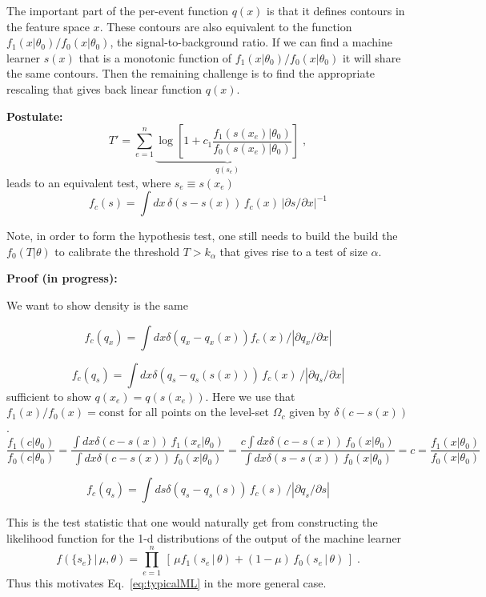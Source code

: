\documentclass[11pt, oneside]{article}   	%
\begin{document}
The important part of the per-event function $q(x)$ is that it defines contours in the feature space $x$. These contours are also equivalent to the function $f_1(x|\theta_0)/f_0(x|\theta_0)$, the signal-to-background ratio. If we can find a machine learner $s(x)$ that is a monotonic function of $f_1(x|\theta_0)/f_0(x|\theta_0)$ it will share the same contours. Then the remaining challenge is to find the appropriate rescaling that gives back  linear function $q(x)$. 

\textbf{Postulate:}
\[
T' = \sum_{e=1}^n \underbrace{\log \left[ 1+c_1\frac {f_1(s(x_e) | \theta_0) }{ f_0(s(x_e) | \theta_0) } \right]}_{q(s_e)} \;,
\]
leads to an equivalent test, where $s_e \equiv s(x_e)$
\[
f_c(s) = \int dx \, \delta(s-s(x)) \, f_c(x)  \,  |\partial s / \partial x|^{-1}
\]



Note, in order to form the hypothesis test, one still needs to build the build the $f_0(T|\theta)$ to calibrate the threshold  $T>k_\alpha$ that gives rise to a test of size $\alpha$. 



\textbf{Proof (in progress):}

We want to show density is the same 

\[
f_c(q_x) = \int dx \delta(q_x-q_x(x)) f_c(x) / |\partial q_x / \partial x|
\]

\[
f_c(q_s) = \int dx \delta(q_s-q_s(s(x))) \, f_c(x) \, / |\partial q_s / \partial x|
\]
sufficient to show $q(x_e) = q(s(x_e))$.  Here we use that $f_1(x)/f_0(x)=\textrm{const}$ for all points on the level-set $\Omega_c$ given by $ \delta(c-s(x))$. 
\[
\frac {f_1(c | \theta_0) }{ f_0(c | \theta_0) } = 
\frac { \int dx \delta(c-s(x)) \, f_1(x_e | \theta_0) }{ \int dx \delta(c-s(x)) \, f_0(x | \theta_0)  } = 
\frac {c \int dx \delta(c-s(x)) \, f_0(x | \theta_0)  }{ \int dx \delta(s-s(x)) \, f_0(x | \theta_0)  } = c =\frac {f_1(x | \theta_0) }{ f_0(x | \theta_0) } 
\]



\[
f_c(q_s) = \int ds \delta(q_s-q_s(s)) \,f_c(s) \, / |\partial q_s / \partial s|
\]


This is the test statistic that one would naturally get from constructing the likelihood function for the 1-d distributions of the output of the machine learner
\begin{equation}\label{eq:NP}
f( \{s_e\} \,|\, \mu, \theta) = \prod_{e=1}^n \, \left[\, \mu f_1( s_e \, |\,  \theta)  + (1-\mu)\, f_0( s_e \,|\, \theta) \,\right] \; .
\end{equation}
Thus this motivates Eq.~\ref{eq:typicalML} in the more general case. 
\end{document}
